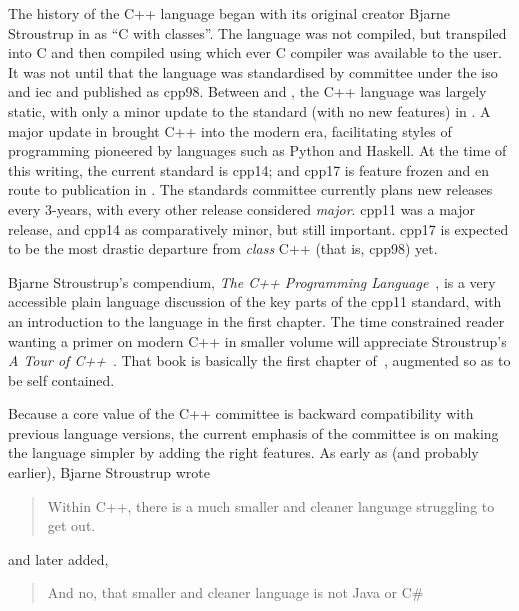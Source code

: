 The history of the C++ language began with its original creator Bjarne
Stroustrup in  as ``C with classes''. The language was not compiled,
but transpiled into C and then compiled using which ever C compiler was
available to the user. It was not until  that the language was
standardised by committee under the \ac{iso} and \ac{iec} and published as
\acl{cpp98}. Between  and , the C++ language was largely
static, with only a minor update to the standard (with no new features) in
. A major update in  brought C++ into the modern era,
facilitating styles of programming pioneered by languages such as Python and
Haskell. At the time of this writing, the current standard is \ac{cpp14}; and
\ac{cpp17} is feature frozen and en route to publication in . The
standards committee currently plans new releases every 3-years, with every other
release considered \emph{major}. \ac{cpp11} was a major release, and \ac{cpp14}
as comparatively minor, but still important. \ac{cpp17} is expected to be the
most drastic departure from \emph{class} C++ (that is, \ac{cpp98}) yet.

Bjarne Stroustrup's compendium, \emph{The C++ Programming
Language}~\cite{Stroustrup2013}, is a very accessible plain language discussion
of the key parts of the \ac{cpp11} standard, with an introduction to the
language in the first chapter. The time constrained reader wanting a primer on
modern C++ in smaller volume will appreciate Stroustrup's \emph{A Tour of
C++}~\cite{Stroustrup2013tour}. That book is basically the first chapter
of~\cite{Stroustrup2013}, augmented so as to be self contained.

Because a core value of the C++ committee is backward compatibility with
previous language versions, the current emphasis of the committee is on making
the language simpler by adding the right features. As early as  (and
probably earlier), Bjarne Stroustrup wrote
%
\begin{quote} Within C++, there is a much smaller and cleaner language
struggling to get out.\\\null\hfill{} \end{quote}
%
and later added,
%
\begin{quote} And no, that smaller and cleaner language is not Java or C\#\\
\null\hfill{}\end{quote}


